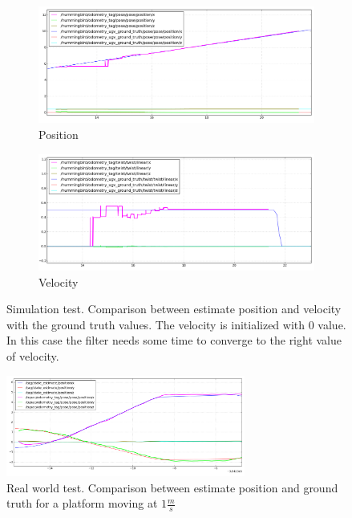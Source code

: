 \begin{figure}[!htbp]
  \centering
   \begin{subfigure}[b]{0.45\textwidth}
        \includegraphics[width=\textwidth]{img/position_simulation.png}
        \caption{Position }
        \label{fig:one}
   \end{subfigure}\hfill
   \begin{subfigure}[b]{0.45\textwidth}
        \includegraphics[width=\textwidth]{img/velocity_simulation.png}
        \caption{Velocity}
        \label{fig:two}
   \end{subfigure}
  \caption{Simulation test. Comparison between estimate position and velocity with the ground truth values. The velocity is initialized with 0 value. In this case the filter needs some time to converge to the right value of velocity.}
  \label{fig:ekf_simulation_hot_init}
\end{figure}

\begin{figure}[!ht]
    \centering
    \includegraphics[width=0.7\textwidth]{img/position_real_world.png}
    \caption{Real world test. Comparison between estimate position and ground truth for a platform moving at $1\frac{m}{s}$}
    \label{fig:ekf_position_real}
\end{figure}

